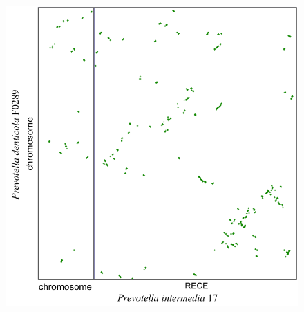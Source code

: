 \begin{figure}[H]
\begin{center}
\begin{minipage}{0.5\textwidth}
   \label{figsyntprev1}
    \end{minipage}
  \begin{minipage}{0.5\textwidth}
  \hspace{1cm}
   \includegraphics[width=1.1\textwidth]{./img/synteny/new/fig8_15b.png}
   \label{figsyntprev2}
    \end{minipage}
    \\
    \begin{minipage}{0.5\textwidth}

\end{minipage}
\end{center}
\end{figure}
